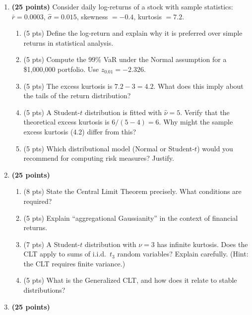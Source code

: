 \documentclass[11pt, a4paper]{article}
\theoremstyle{definition}
\begin{document}
\begin{enumerate}[label=\textbf{Y3-Q\arabic*.}]

\item \textbf{(25 points)} Consider daily log-returns of a stock with sample statistics: $\bar{r} = 0.0003$, $\hat{\sigma} = 0.015$, skewness $= -0.4$, kurtosis $= 7.2$.

\begin{enumerate}[label=(\alph*)]
  \item (5 pts) Define the log-return and explain why it is preferred over simple returns in statistical analysis.
  \item (5 pts) Compute the 99\% VaR under the Normal assumption for a \$1{,}000{,}000 portfolio. Use $z_{0.01} = -2.326$.
  \item (5 pts) The excess kurtosis is $7.2 - 3 = 4.2$. What does this imply about the tails of the return distribution?
  \item (5 pts) A Student-$t$ distribution is fitted with $\hat{\nu} = 5$. Verify that the theoretical excess kurtosis is $6/(5-4) = 6$. Why might the sample excess kurtosis (4.2) differ from this?
  \item (5 pts) Which distributional model (Normal or Student-$t$) would you recommend for computing risk measures? Justify.
\end{enumerate}

\item \textbf{(25 points)}

\begin{enumerate}[label=(\alph*)]
  \item (8 pts) State the Central Limit Theorem precisely. What conditions are required?
  \item (5 pts) Explain ``aggregational Gaussianity'' in the context of financial returns.
  \item (7 pts) A Student-$t$ distribution with $\nu = 3$ has infinite kurtosis. Does the CLT apply to sums of i.i.d.\ $t_3$ random variables? Explain carefully. (Hint: the CLT requires finite variance.)
  \item (5 pts) What is the Generalized CLT, and how does it relate to stable distributions?
\end{enumerate}

\item \textbf{(25 points)}


\end{enumerate}
\end{document}
